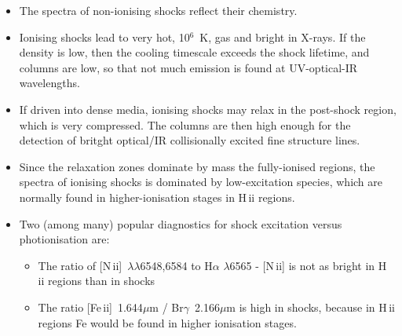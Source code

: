 \begin{itemize}

\item The spectra of non-ionising shocks reflect their chemistry. 

\item Ionising shocks lead to very hot, 10$^6$~K, gas and bright in
  X-rays. If the density is low, then the cooling timescale exceeds
  the shock lifetime, and columns are low, so that not much emission
  is found at UV-optical-IR wavelengths.

\item If driven into dense media, ionising shocks may relax in the
  post-shock region, which is very compressed. The columns are then
  high enough for the detection of britght optical/IR collisionally
  excited fine structure lines.  


\newpage
\item Since the relaxation zones dominate by mass the fully-ionised
  regions, the spectra of ionising shocks is dominated by
  low-excitation species, which are normally found in
  higher-ionisation stages in H\,{\sc ii} regions. 

\item Two (among many) popular diagnostics for shock excitation
  versus photionisation are:

\begin{itemize}
\item The ratio of [N\,{\sc ii}]~$\lambda\lambda$6548,6584 to
  H$\alpha$ $\lambda$6565 - [N\,{\sc ii}] is not as bright in H\,{\sc
    ii} regions than in shocks  
 
\item The ratio [Fe\,{\sc ii}]~1.644$\mu$m / Br$\gamma$~2.166$\mu$m is high in
  shocks, because in H\,{\sc ii} regions Fe would be found in higher
  ionisation stages.


\end{itemize}

\end{itemize}


